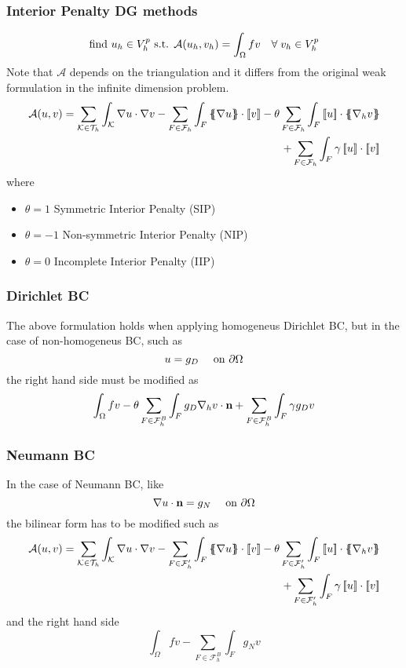 \subsubsection*{Interior Penalty DG methods}
\[
    \text{find } u_h \in V_h^p \text{ s.t. } \mathcal{A}(u_h, v_h) = \int_\Omega fv \quad \forall \;v_h \in V_h^p
\]
Note that \(\mathcal{A}\) depends on the triangulation and it differs from the original weak formulation in the infinite dimension problem.
\begin{equation*}
    \begin{split}
        \mathcal{A}(u, v) =  \sum_{\element \in \triangulation} \int_\element \grad u \cdot \grad v  - \sum_{F \in \mathcal{F}_h} \int_F \average{\grad u} \cdot \jump{v}  - \theta \sum_{F \in \mathcal{F}_h} \int_F \jump{u} \cdot \average{\grad_h v} \\+ \sum_{F \in \mathcal{F}_h} \int_F \gamma \jump{u} \cdot \jump{v}
    \end{split}
\end{equation*}
where 
\begin{itemize}
    \item \(\theta =  1\) Symmetric Interior Penalty (SIP)
    \item \(\theta =  -1\) Non-symmetric Interior Penalty (NIP)
    \item \(\theta =  0\) Incomplete Interior Penalty (IIP)
\end{itemize}
\subsubsection*{Dirichlet BC}
The above formulation holds when applying homogeneus Dirichlet BC, but in the case of non-homogeneus BC, such as 
\[
    u = g_D \quad \text{ on } \partial\Omega
\]
the right hand side must be modified as
\[
    \int_\Omega fv -\theta \sum_{F \in \mathcal{F}^B_h}\int_F g_D \nabla_h v \cdot \textbf{n} + \sum_{F \in \mathcal{F}^B_h} \int_F \gamma g_D v 
\]
\subsubsection*{Neumann BC}
In the case of Neumann BC, like 
\[
    \nabla u \cdot \textbf{n} = g_N \quad \text{ on } \partial\Omega
\]
the bilinear form has to be modified such as 
\begin{equation*}
    \begin{split}
        \mathcal{A}(u, v) =  \sum_{\element \in \triangulation} \int_\element \grad u \cdot \grad v  - \sum_{F \in \mathcal{F}'_h} \int_F \average{\grad u} \cdot \jump{v}  - \theta \sum_{F \in \mathcal{F}'_h} \int_F \jump{u} \cdot \average{\grad_h v} \\+ \sum_{F \in \mathcal{F}'_h} \int_F \gamma \jump{u} \cdot \jump{v}
    \end{split}
\end{equation*}
and the right hand side 
\[
    \int_\Omega fv - \sum_{F \in \mathcal{F}^B_h}\int_F g_N v
\]
